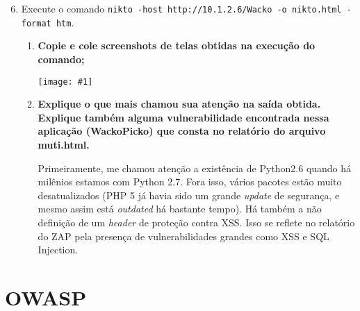 \documentclass{article}
\newcommand{\code}[1]{\texttt{#1}}
\newcommand{\img}[1]{%
    \texttt{[image: \#1]}
}
\begin{document}
    \begin{enumerate}
        \setcounter{enumi}{5}
        \item Execute o comando \code{nikto -host http://10.1.2.6/Wacko -o
            nikto.html -format htm}.

            \begin{enumerate}
                \item \textbf{Copie e cole screenshots de telas obtidas na
                        execução do comando;}

                    \img{imgs/q1_5}

                \item \textbf{Explique o que mais chamou sua atenção na saída
                    obtida.  Explique também alguma vulnerabilidade encontrada
                    nessa aplicação (WackoPicko) que consta no relatório do
                    arquivo muti.html.}

                    Primeiramente, me chamou atenção a existência de Python2.6
                    quando há milênios estamos com Python 2.7. Fora isso,
                    vários pacotes estão muito desatualizados (PHP 5 já havia
                    sido um grande \textit{update} de segurança, e mesmo assim
                    está \textit{outdated} há bastante tempo). Há também a não
                    definição de um \textit{header} de proteção contra XSS\@.
                    Isso se reflete no relatório do ZAP pela presença de
                    vulnerabilidades grandes como XSS e SQL Injection.
            \end{enumerate}
    \end{enumerate}

    \section{OWASP}
\end{document}

